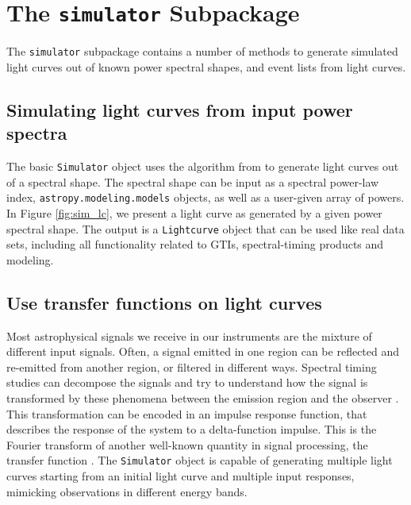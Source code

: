 \documentclass[twocolumn]{aastex62}
\begin{document}
\newpage
\section{The \texttt{simulator} Subpackage}
\label{sec:simulator}

The \texttt{simulator} subpackage contains a number of methods to generate simulated light curves out of known power spectral shapes, and event lists from light curves. 

\subsection{Simulating light curves from input power spectra}
The basic \texttt{Simulator} object uses the algorithm from \citet{timmer1995} to generate light curves out of a spectral shape. 
The spectral shape can be input as a spectral power-law index, \texttt{astropy.modeling.models} objects, as well as a user-given array of powers.
In Figure \ref{fig:sim_lc}, we present a light curve as generated by a given power spectral shape. 
The output is a \texttt{Lightcurve} object that can be used like real data sets, including all functionality related to GTIs, spectral-timing products and modeling. 

\subsection{Use transfer functions on light curves}
Most astrophysical signals we receive in our instruments are the mixture of different input signals. 
Often, a signal emitted in one region can be reflected and re-emitted from another region, or filtered in different ways. 
Spectral timing studies can decompose the signals and try to understand how the signal is transformed by these phenomena between the emission region and the observer \citep[see][for a review]{uttley2014}.
This transformation can be encoded in an impulse response function, that describes the response of the system to a delta-function impulse. 
This is the Fourier transform of another well-known quantity in signal processing, the transfer function \citep[see][]{girod2001signals}.
The \texttt{Simulator} object is capable of generating multiple light curves starting from an initial light curve and multiple input responses, mimicking observations in different energy bands. 
\end{document}
